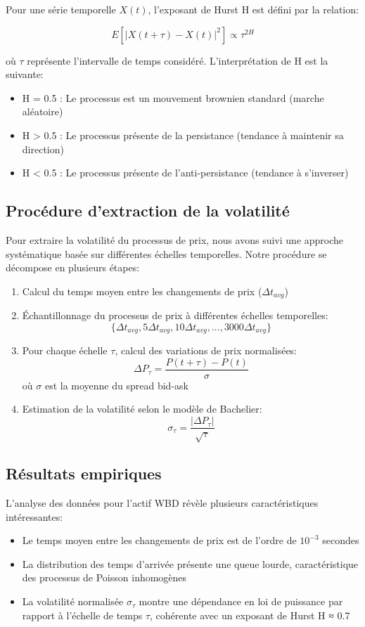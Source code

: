 \documentclass[12pt,a4paper]{article}
\theoremstyle{definition}
\theoremstyle{remark}
\begin{document}
Pour une série temporelle \(X(t)\), l'exposant de Hurst H est défini par la relation:

\[
E[|X(t+\tau) - X(t)|^2] \propto \tau^{2H}
\]

où \(\tau\) représente l'intervalle de temps considéré. L'interprétation de H est la suivante:
\begin{itemize}
    \item H = 0.5 : Le processus est un mouvement brownien standard (marche aléatoire)
    \item H > 0.5 : Le processus présente de la persistance (tendance à maintenir sa direction)
    \item H < 0.5 : Le processus présente de l'anti-persistance (tendance à s'inverser)
\end{itemize}

\subsection{Procédure d'extraction de la volatilité}

Pour extraire la volatilité du processus de prix, nous avons suivi une approche systématique basée sur différentes échelles temporelles. Notre procédure se décompose en plusieurs étapes:

\begin{enumerate}
    \item Calcul du temps moyen entre les changements de prix (\(\Delta t_{avg}\))
    \item Échantillonnage du processus de prix à différentes échelles temporelles:
    \[\{\Delta t_{avg}, 5\Delta t_{avg}, 10\Delta t_{avg}, ..., 3000\Delta t_{avg}\}\]
    \item Pour chaque échelle \(\tau\), calcul des variations de prix normalisées:
    \[\Delta P_{\tau} = \frac{P(t+\tau) - P(t)}{\sigma}\]
    où \(\sigma\) est la moyenne du spread bid-ask
    \item Estimation de la volatilité selon le modèle de Bachelier:
    \[\sigma_{\tau} = \frac{|\Delta P_{\tau}|}{\sqrt{\tau}}\]
\end{enumerate}

\subsection{Résultats empiriques}

L'analyse des données pour l'actif WBD révèle plusieurs caractéristiques intéressantes:

\begin{itemize}
    \item Le temps moyen entre les changements de prix est de l'ordre de \(10^{-3}\) secondes
    \item La distribution des temps d'arrivée présente une queue lourde, caractéristique des processus de Poisson inhomogènes
    \item La volatilité normalisée \(\sigma_{\tau}\) montre une dépendance en loi de puissance par rapport à l'échelle de temps \(\tau\), cohérente avec un exposant de Hurst H ≈ 0.7
\end{itemize}
\end{document}
